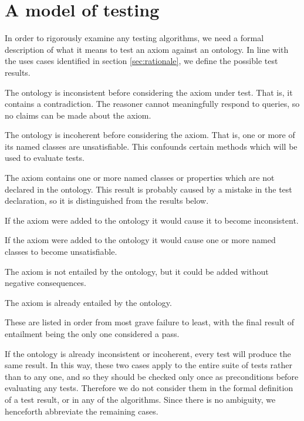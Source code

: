 \documentclass[paper.tex]{subfiles}
\begin{document}
\section{A model of testing}
\label{sec:model}

In order to rigorously examine any testing algorithms, we need a formal description of what it means to test an axiom against an ontology.
In line with the uses cases identified in section \ref{sec:rationale}, we define the possible test results.
\begin{description}[
  before={\renewcommand\makelabel[1]{\normalfont\itshape##1:}},
  labelindent=1em,
  leftmargin=2em,
  nosep,
]
  \item[Ontology already inconsistent]  The ontology is inconsistent before considering the axiom under test.  That is, it contains a contradiction.  The reasoner cannot meaningfully respond to queries, so no claims can be made about the axiom.
  \item[Ontology already incoherent]  The ontology is incoherent before considering the axiom.  That is, one or more of its named classes are unsatisfiable.  This confounds certain methods which will be used to evaluate tests.
  \item[Missing entity in axiom]  The axiom contains one or more named classes or properties which are not declared in the ontology.  This result is probably caused by a mistake in the test declaration, so it is distinguished from the results below.
  \item[Axiom causes inconsistency]  If the axiom were added to the ontology it would cause it to become inconsistent.
  \item[Axiom causes incoherence]  If the axiom were added to the ontology it would cause one or more named classes to become unsatisfiable.
  \item[Axiom absent]  The axiom is not entailed by the ontology, but it could be added without negative consequences.
  \item[Axiom entailed]  The axiom is already entailed by the ontology.
\end{description}

These are listed in order from most grave failure to least, with the final result of entailment being the only one considered a pass.

If the ontology is already inconsistent or incoherent, every test will produce the same result.  In this way, these two cases apply to the entire suite of tests rather than to any one, and so they should be checked only once as preconditions before evaluating any tests.  Therefore we do not consider them in the formal definition of a test result, or in any of the algorithms.  Since there is no ambiguity, we henceforth abbreviate the remaining cases.
\end{document}
